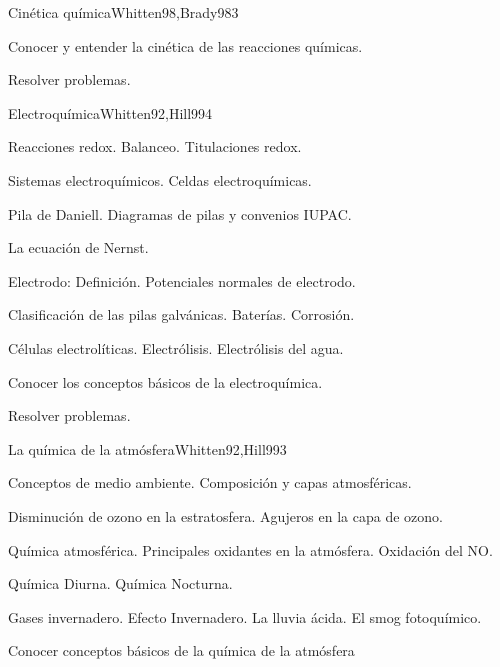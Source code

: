 \begin{syllabus}
\begin{unit}{Cinética química}{Whitten98,Brady98}{3}
   \begin{unitgoals}
      \item Conocer y entender la cinética de las reacciones químicas.
      \item Resolver problemas.
   \end{unitgoals}
\end{unit}

\begin{unit}{Electroquímica}{Whitten92,Hill99}{4}
\begin{topics}
      \item Reacciones redox. Balanceo. Titulaciones redox.
      \item Sistemas electroquímicos. Celdas electroquímicas.
      \item Pila de Daniell. Diagramas de pilas y convenios IUPAC.
      \item La ecuación de Nernst.
      \item Electrodo: Definición. Potenciales normales de electrodo.
      \item Clasificación de las pilas galvánicas. Baterías. Corrosión.
      \item Células electrolíticas. Electrólisis. Electrólisis del agua.
   \end{topics}

   \begin{unitgoals}
      \item Conocer los conceptos básicos de la electroquímica.
      \item Resolver problemas.
   \end{unitgoals}
\end{unit}

\begin{unit}{La química de la atmósfera}{Whitten92,Hill99}{3}
\begin{topics}
      \item Conceptos de medio ambiente. Composición y capas atmosféricas.
      \item Disminución de ozono en la estratosfera. Agujeros en la capa de ozono.
      \item Química atmosférica. Principales oxidantes en la atmósfera. Oxidación del NO.
      \item Química Diurna. Química Nocturna.
      \item Gases invernadero. Efecto Invernadero. La lluvia ácida. El smog fotoquímico.
    \end{topics}

   \begin{unitgoals}
      \item Conocer conceptos básicos de la química de la atmósfera
   \end{unitgoals}
\end{unit}

\begin{coursebibliography}
\end{coursebibliography}
\end{syllabus}
